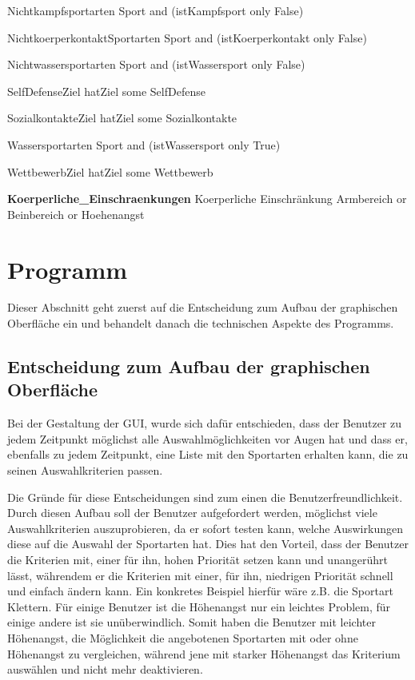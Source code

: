 Nichtkampfsportarten 
	Sport and (istKampfsport only False)
	
NichtkoerperkontaktSportarten 
	Sport and (istKoerperkontakt only False)
	
Nichtwassersportarten 
	Sport and (istWassersport only False)
	
SelfDefenseZiel 
	hatZiel some SelfDefense
	
SozialkontakteZiel 
	hatZiel some Sozialkontakte
	
Wassersportarten 
	Sport and (istWassersport only True)
	
WettbewerbZiel 
	hatZiel some Wettbewerb
	
\textbf{Koerperliche\_Einschraenkungen}
Koerperliche Einschr\"ankung
Armbereich
 or Beinbereich
 or Hoehenangst



\section{Programm}

Dieser Abschnitt geht zuerst auf die Entscheidung zum Aufbau der graphischen Oberfl\"ache ein und behandelt danach die technischen Aspekte des Programms. 

\subsection{Entscheidung zum Aufbau der graphischen Oberfl\"ache}
Bei der Gestaltung der GUI, wurde sich daf\"ur entschieden, dass der Benutzer zu jedem Zeitpunkt m\"oglichst alle Auswahlm\"oglichkeiten vor Augen hat und dass er, ebenfalls zu jedem Zeitpunkt, eine Liste mit den Sportarten erhalten kann, die zu seinen Auswahlkriterien passen.

Die Gr\"unde f\"ur diese Entscheidungen sind zum einen die Benutzerfreundlichkeit. Durch diesen Aufbau soll der Benutzer aufgefordert werden, m\"oglichst viele Auswahlkriterien auszuprobieren, da er sofort testen kann, welche Auswirkungen diese auf die Auswahl der Sportarten hat. Dies hat den Vorteil, dass der Benutzer die Kriterien mit, einer f\"ur ihn, hohen Priorit\"at setzen kann und unanger\"uhrt l\"asst, w\"ahrendem er die Kriterien mit einer, f\"ur ihn, niedrigen Priorit\"at schnell und einfach \"andern kann. Ein konkretes Beispiel hierf\"ur w\"are z.B. die Sportart Klettern. F\"ur einige Benutzer ist die H\"ohenangst nur ein leichtes Problem, f\"ur einige andere ist sie un\"uberwindlich. Somit haben die Benutzer mit leichter H\"ohenangst, die M\"oglichkeit die angebotenen Sportarten mit oder ohne H\"ohenangst zu vergleichen, w\"ahrend jene mit starker H\"ohenangst das Kriterium ausw\"ahlen und nicht mehr deaktivieren.


